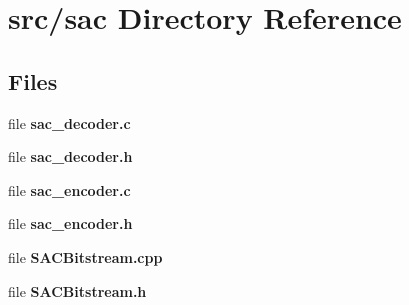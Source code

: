 \section{src/sac Directory Reference}
\label{dir_6cfe6ffb8c796076a14814ebc6f46a7c}
\subsection*{Files}
\begin{DoxyCompactItemize}
\item 
file \textbf{ sac\+\_\+decoder.\+c}
\item 
file \textbf{ sac\+\_\+decoder.\+h}
\item 
file \textbf{ sac\+\_\+encoder.\+c}
\item 
file \textbf{ sac\+\_\+encoder.\+h}
\item 
file \textbf{ S\+A\+C\+Bitstream.\+cpp}
\item 
file \textbf{ S\+A\+C\+Bitstream.\+h}
\end{DoxyCompactItemize}
